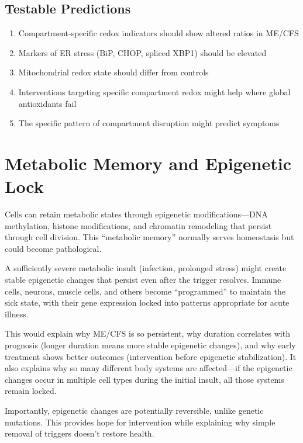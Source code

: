 \subsection{Testable Predictions}

\begin{enumerate}
    \item Compartment-specific redox indicators should show altered ratios in ME/CFS
    \item Markers of ER stress (BiP, CHOP, spliced XBP1) should be elevated
    \item Mitochondrial redox state should differ from controls
    \item Interventions targeting specific compartment redox might help where global antioxidants fail
    \item The specific pattern of compartment disruption might predict symptoms
\end{enumerate}


\section{Metabolic Memory and Epigenetic Lock}
\label{sec:epigenetic-lock}

\begin{open_question}
Cells can retain metabolic states through epigenetic modifications---DNA methylation, histone modifications, and chromatin remodeling that persist through cell division. This ``metabolic memory'' normally serves homeostasis but could become pathological.

A sufficiently severe metabolic insult (infection, prolonged stress) might create stable epigenetic changes that persist even after the trigger resolves. Immune cells, neurons, muscle cells, and others become ``programmed'' to maintain the sick state, with their gene expression locked into patterns appropriate for acute illness.

This would explain why ME/CFS is so persistent, why duration correlates with prognosis (longer duration means more stable epigenetic changes), and why early treatment shows better outcomes (intervention before epigenetic stabilization). It also explains why so many different body systems are affected---if the epigenetic changes occur in multiple cell types during the initial insult, all those systems remain locked.

Importantly, epigenetic changes are potentially reversible, unlike genetic mutations. This provides hope for intervention while explaining why simple removal of triggers doesn't restore health.
\end{open_question}

